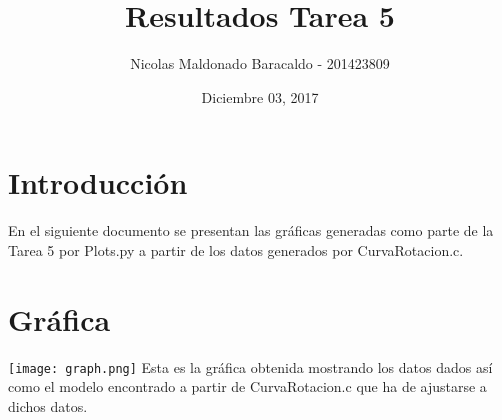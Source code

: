 \documentclass[11pt]{article}
\title{Resultados Tarea 5}
\author{Nicolas Maldonado Baracaldo - 201423809}
\date{Diciembre 03, 2017}
\begin{document}
\maketitle
\section{Introducción}
En el siguiente documento se presentan las gráficas generadas como parte de la Tarea 5 por Plots.py a partir de los datos generados por CurvaRotacion.c.

\section{Gráfica}
\texttt{[image: graph.png]}
Esta es la gráfica obtenida mostrando los datos dados así como el modelo encontrado a partir de CurvaRotacion.c que ha de ajustarse a dichos datos.
\end{document}
